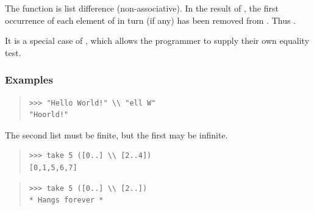 \begin{haddockdesc}
\item[\begin{tabular}{@{}l}
({\char '134}{\char '134}) :: Eq a => {\char 91}a{\char 93} -> {\char 91}a{\char 93} -> {\char 91}a{\char 93}
\end{tabular}]
{\haddockbegindoc
The  function is list difference (non-associative).
 In the result of   , the first occurrence of each element of
  in turn (if any) has been removed from .  Thus
 .\par
It is a special case of , which allows the programmer
 to supply their own equality test.\par
\subsubsection*{\textbf{Examples}}
\begin{quote}
{\haddockverb\begin{verbatim}
>>> "Hello World!" \\ "ell W"
"Hoorld!"

\end{verbatim}}
\end{quote}
The second list must be finite, but the first may be infinite.\par
\begin{quote}
{\haddockverb\begin{verbatim}
>>> take 5 ([0..] \\ [2..4])
[0,1,5,6,7]

\end{verbatim}}
\end{quote}
\begin{quote}
{\haddockverb\begin{verbatim}
>>> take 5 ([0..] \\ [2..])
* Hangs forever *

\end{verbatim}}
\end{quote}}
\end{haddockdesc}
